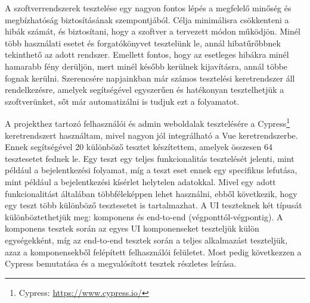 A szoftverrendszerek tesztelése egy nagyon fontos lépés a megfelelő minőség és megbízhatóság biztosításának szempontjából. Célja minimálisra csökkenteni a hibák számát, és biztosítani, hogy a szoftver a tervezett módon működjön. Minél több használati esetet és forgatókönyvet tesztelünk le, annál hibatűrőbbnek tekinthető az adott rendszer. Emellett fontos, hogy az esetleges hibákra minél hamarabb fény derüljön, mert minél később kerülnek kijavításra, annál többe fognak kerülni. Szerencsére napjainkban már számos tesztelési keretrendszer áll rendelkezésre, amelyek segítségével egyszerűen és hatékonyan tesztelhetjük a szoftverünket, sőt már automatizálni is tudjuk ezt a folyamatot.

A projekthez tartozó felhasználói és admin weboldalak tesztelésére a Cypress\footnote{Cypress: \url{https://www.cypress.io/}} keretrendszert használtam, mivel nagyon jól integrálható a Vue keretrendszerbe. Ennek segítségével 20 különböző tesztet készítettem, amelyek összesen 64 tesztesetet fednek le. Egy teszt egy teljes funkcionalitás tesztelését jelenti, mint például a bejelentkezési folyamat, míg a teszt eset ennek egy specifikus lefutása, mint például a bejelentkezési kísérlet helytelen adatokkal. Mivel egy adott funkcionalitást általában többféleképpen lehet használni, ebből  következik, hogy egy teszt több különböző tesztesetet is tartalmazhat. A UI teszteknek két típusát különböztethetjük meg: komponens és end-to-end (végponttól-végpontig). A komponens tesztek során az egyes UI komponenseket teszteljük külön egységekként, míg az end-to-end tesztek során a teljes alkalmazást teszteljük, azaz a komponensekből felépített felhasználói felületet. Most pedig következzen a Cypress bemutatása és a megvalósított tesztek részletes leírása.

